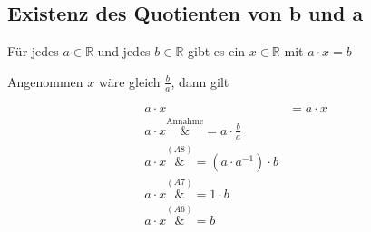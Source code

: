 \documentclass{article}
\begin{document}
\subsection{Existenz des Quotienten von b und a}
Für jedes $a \in \mathbb{R}$ und jedes $b \in \mathbb{R}$ gibt es ein $x \in \mathbb{R}$
mit $a \cdot x = b$

Angenommen $x$ wäre gleich $\frac{b}{a}$, dann gilt

\begin{align*}
  a \cdot x &= a \cdot x \\
  a \cdot x \overset{\text{Annahme}}&= a \cdot \frac{b}{a} \\ 
  a \cdot x \overset{\hyperref[a8]{(A8)}}&= (a \cdot a^{-1}) \cdot b \\ 
  a \cdot x \overset{\hyperref[a7]{(A7)}}&= 1 \cdot b \\
  a \cdot x \overset{\hyperref[a6]{(A6)}}&= b
\end{align*}
\end{document}
